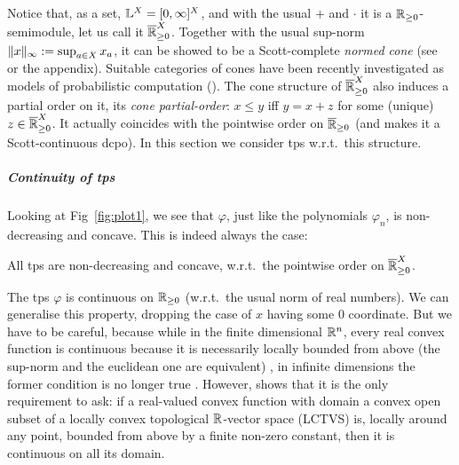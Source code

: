 %
Notice that, as a set, $\mathbb{L}^X=[0,\infty]^X$, and with the usual $+$ and $\cdot$ it is a $\mathbb{R}_{\geq0}$-semimodule, let us call it $\overline{\mathbb{R}}_{\geq 0}^X$.
Together with the usual sup-norm $\lVert x\rVert_\infty:=\sup_{a\in X} x_a$, it can be showed to be a Scott-complete \emph{normed cone} (see~\cite{Selinger2004} or the appendix).
Suitable categories of cones have been recently investigated as models of probabilistic computation (\cite{Crubillie2018, EhrPagTas2018, Ehrhard2020}).
The cone structure of $\overline{\mathbb{R}}_{\geq 0}^X$ also induces a partial order on it, its \emph{cone partial-order}:
$x\leq y$ iff $y=x+z$ for some (unique) $z\in\overline{\mathbb{R}}_{\geq 0}^X$.
It actually coincides with the pointwise order on $\overline{\mathbb{R}}_{\geq 0}$ (and makes it a Scott-continuous dcpo).
In this section we consider tps w.r.t.\ this structure.

\subparagraph*{Continuity of tps}\label{subsec:cont}%

Looking at Fig~\ref{fig:plot1}, we see that $\varphi$, just like the polynomials $\varphi_{n}$, is non-decreasing and concave.
This is indeed always the case:

\begin{proposition}\label{prop:nondecr+conc}
 All tps 
are non-decreasing and concave, w.r.t.\ the pointwise order on $\overline{\mathbb{R}}_{\geq 0}^{X}$.
\end{proposition}


The tps $\varphi$ is continuous on $\mathbb{R}_{\geq0}$ (w.r.t.\ the usual norm of real numbers).
We can generalise this property, dropping the case of $x$ having some $0$ coordinate.
But we have to be careful, because while in the finite dimensional $\mathbb{R}^n$, every real convex function is continuous because it is necessarily locally bounded from above (the sup-norm and the euclidean one are equivalent) \cite[Proposition 4.7]{Cobzas2017}, in infinite dimensions the former condition is no longer true \cite[Example 4.8]{Cobzas2017}.
However, \cite[Proposition 4.4.(3)]{Cobzas2017} shows that it is the only requirement to ask: if a real-valued convex function with domain a convex open subset of a locally convex topological $\mathbb{R}$-vector space (LCTVS) is, locally around any point, bounded from above by a finite non-zero constant, then it is continuous on all its domain.

